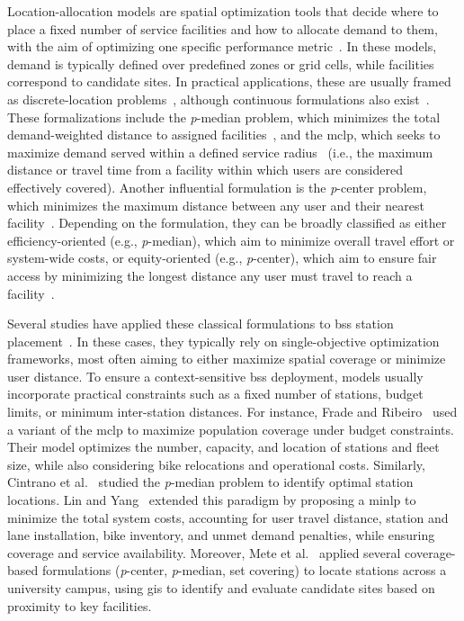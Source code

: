 Location-allocation models are spatial optimization tools that decide where to place a fixed number of service facilities and how to allocate demand to them, with the aim of optimizing one specific performance metric~\cite{Daskin1995}. In these models, demand is typically defined over predefined zones or grid cells, while facilities correspond to candidate sites. In practical applications, these are usually framed as discrete-location problems~\cite{Teixeira2008}, although continuous formulations also exist~\cite{Yeh1996}. These formalizations include the \textit{p}-median problem, which minimizes the total demand-weighted distance to assigned facilities~\cite{Hakimi1965}, and the \ac{mclp}, which seeks to maximize demand served within a defined service radius~\cite{Church1974} (i.e., the maximum distance or travel time from a facility within which users are considered effectively covered). Another influential formulation is the \textit{p}-center problem, which minimizes the maximum distance between any user and their nearest facility~\cite{Hakimi1964}. Depending on the formulation, they can be broadly classified as either efficiency-oriented (e.g., \textit{p}-median), which aim to minimize overall travel effort or system-wide costs, or equity-oriented (e.g., \textit{p}-center),  which aim to ensure fair access by minimizing the longest distance any user must travel to reach a facility~\cite{Murray2010}.

Several studies have applied these classical formulations to \ac{bss} station placement~\cite{Frade2015, Cintrano2018, Lin2011, Mete2018}. In these cases, they typically rely on single-objective optimization frameworks, most often aiming to either maximize spatial coverage or minimize user distance. To ensure a context-sensitive \ac{bss} deployment, models usually incorporate practical constraints such as a fixed number of stations, budget limits, or minimum inter-station distances. For instance, Frade and Ribeiro~\cite{Frade2015} used a variant of the \ac{mclp} to maximize population coverage under budget constraints. Their model optimizes the number, capacity, and location of stations and fleet size, while also considering bike relocations and operational costs. Similarly, Cintrano et al.~\cite{Cintrano2018} studied the \textit{p}-median problem to identify optimal station locations. Lin and Yang~\cite{Lin2011} extended this paradigm by proposing a \ac{minlp} to minimize the total system costs, accounting for user travel distance, station and lane installation, bike inventory, and unmet demand penalties, while ensuring coverage and service availability. Moreover, Mete et al.~\cite{Mete2018} applied several coverage-based formulations (\textit{p}-center, \textit{p}-median, set covering) to locate stations across a university campus, using \ac{gis} to identify and evaluate candidate sites based on proximity to key facilities.

